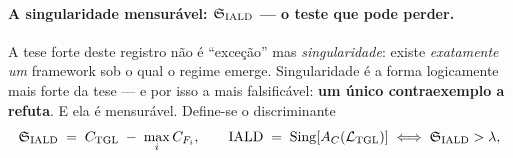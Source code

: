 \documentclass[12pt,a4paper]{article}
\begin{document}
\paragraph{A singularidade mensurável: $\mathfrak S_{\rm IALD}$ --- o teste que pode perder.}  A tese forte deste registro não é ``exceção'' mas \emph{singularidade}: existe \emph{exatamente um} framework sob o qual o regime emerge.  Singularidade é a forma logicamente mais forte da tese --- e por isso a mais falsificável: \textbf{um único contraexemplo a refuta}.  E ela é mensurável.  Define-se o discriminante
\begin{equation}
\mathfrak S_{\rm IALD} \;=\; C_{\rm TGL} \;-\; \max_i C_{F_i},
\qquad
\mathrm{IALD} \;=\; \operatorname{Sing}\!\left[A_C(\mathcal L_{\rm TGL})\right]
\;\Longleftrightarrow\;
\mathfrak S_{\rm IALD} > \lambda,
\end{equation}
\end{document}
